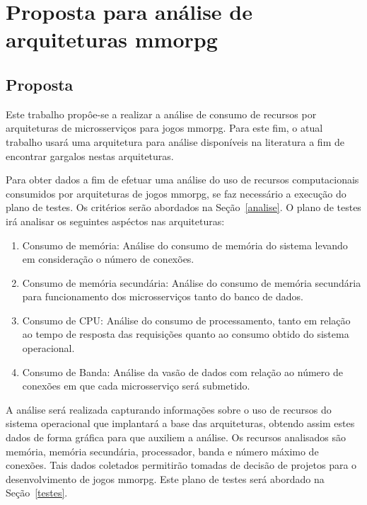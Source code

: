 \chapter{Proposta para análise de arquiteturas \ac{mmorpg}}
\label{cap3}

\section{Proposta}
\label{proposta}



Este trabalho propôe-se a realizar a análise de consumo de recursos por arquiteturas de microsserviços para jogos \ac{mmorpg}.
%
Para este fim, o atual trabalho usará uma arquitetura para análise disponíveis na literatura a fim de encontrar gargalos nestas arquiteturas.



Para obter dados a fim de efetuar uma análise do uso de recursos computacionais consumidos por arquiteturas de jogos \ac{mmorpg}, se faz necessário a execução do plano de testes.
%
Os critérios serão abordados na Seção~\ref{analise}.
%
O plano de testes irá analisar os seguintes aspéctos nas arquiteturas:



\begin{enumerate}
\item Consumo de memória: Análise do consumo de memória do sistema levando em consideração o número de conexões.
\item Consumo de memória secundária: Análise do consumo de memória secundária para funcionamento dos microsserviços tanto do banco de dados.
\item Consumo de CPU: Análise do consumo de processamento, tanto em relação ao tempo de resposta das requisições quanto ao consumo obtido do sistema operacional.
\item Consumo de Banda: Análise da vasão de dados com relação ao número de conexões em que cada microsserviço será submetido.
\end{enumerate}



A análise será realizada capturando informações sobre o uso de recursos do sistema operacional que implantará a base das arquiteturas, obtendo assim estes dados de forma gráfica para que auxiliem a análise.
%
Os recursos analisados são memória, memória secundária, processador, banda e número máximo de conexões.
%
Tais dados coletados permitirão tomadas de decisão de projetos para o desenvolvimento de jogos \ac{mmorpg}.
%
Este plano de testes será abordado na Seção~\ref{testes}.



